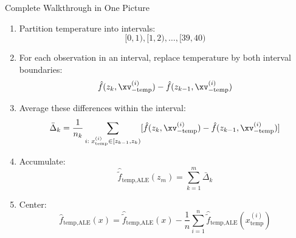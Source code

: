 \documentclass[10pt,compress,t,notes=noshow,xcolor=table]{beamer}
\begin{document}
\begin{framev}[align=top]{Complete Walkthrough in One Picture}
\begin{enumerate}[<+->]
\item Partition temperature into intervals:
$$
[0,1),[1,2),\ldots,[39,40)
$$
\item For each observation in an interval, replace temperature by both interval boundaries:
$$
\hat f(z_k,\xv_{-\text{temp}}^{(i)})
-
\hat f(z_{k-1},\xv_{-\text{temp}}^{(i)})
$$
\item Average these differences within the interval:
$$
\bar\Delta_k
=
\frac{1}{n_k}
\sum_{i:\;x_{\text{temp}}^{(i)}\in[z_{k-1},z_k)}
[
\hat f(z_k,\xv_{-\text{temp}}^{(i)})
-
\hat f(z_{k-1},\xv_{-\text{temp}}^{(i)})
]
$$
\item Accumulate:
$$
\hat{\tilde f}_{\text{temp},\text{ALE}}(z_m)
=
\sum_{k=1}^{m}\bar\Delta_k
$$
\item Center:
$$
\hat f_{\text{temp},\text{ALE}}(x)
=
\hat{\tilde f}_{\text{temp},\text{ALE}}(x)
-
\frac{1}{n}
\sum_{i=1}^{n}
\hat{\tilde f}_{\text{temp},\text{ALE}}(x_{\text{temp}}^{(i)})
$$
\end{enumerate}
\end{framev}

\endlecture
\end{document}
